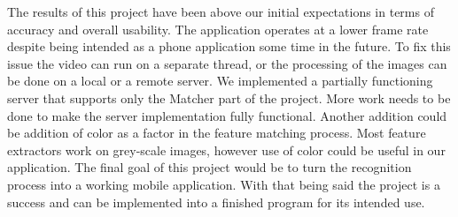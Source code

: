 \documentclass{article}
\begin{document}
The results of this project have been above our initial expectations in terms of accuracy and overall usability. 
The application operates at a lower frame rate despite being intended as a phone application some time in the future.
To fix this issue the video can run on a separate thread, or the processing of the images can be done on a local or a remote server.
We implemented a partially functioning server that supports only the Matcher part of the project. 
More work needs to be done to make the server implementation fully functional.
Another addition could be addition of color as a factor in the feature matching process.
Most feature extractors work on grey-scale images, however use of color could be useful in our application.
The final goal of this project would be to turn the recognition process into a working mobile application.
With that being said the project is a success and can be implemented into a finished program for its intended use.




\newpage





\end{document}
